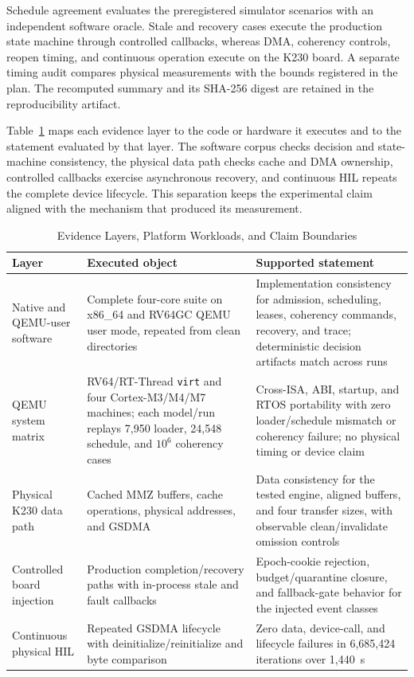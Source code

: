 \documentclass[lettersize,journal]{IEEEtran}
\begin{document}
Schedule agreement evaluates the preregistered simulator scenarios with an
independent software oracle. Stale and recovery cases execute the production
state machine through controlled callbacks, whereas DMA, coherency controls,
reopen timing, and continuous operation execute on the K230 board. A separate
timing audit compares physical measurements with the bounds registered in the
plan. The recomputed summary and its SHA-256 digest are retained in the
reproducibility artifact.

Table~\ref{tab:layers} maps each evidence layer to the code or hardware it
executes and to the statement evaluated by that layer. The software corpus
checks decision and state-machine consistency, the physical data path checks
cache and DMA ownership, controlled callbacks exercise asynchronous recovery,
and continuous HIL repeats the complete device lifecycle. This separation
keeps the experimental claim aligned with the mechanism that produced its
measurement.

\begin{table}[t]
\caption{Evidence Layers, Platform Workloads, and Claim Boundaries}
\label{tab:layers}
\centering
\footnotesize
\begin{tabular}{@{}p{}p{}p{}@{}}
\toprule
Layer & Executed object & Supported statement \\
\midrule
Native and QEMU-user software & Complete four-core suite on x86\_64 and RV64GC QEMU user mode, repeated from clean directories & Implementation consistency for admission, scheduling, leases, coherency commands, recovery, and trace; deterministic decision artifacts match across runs \\
QEMU system matrix & RV64/RT-Thread \texttt{virt} and four Cortex-M3/M4/M7 machines; each model/run replays 7,950 loader, 24,548 schedule, and $10^6$ coherency cases & Cross-ISA, ABI, startup, and RTOS portability with zero loader/schedule mismatch or coherency failure; no physical timing or device claim \\
Physical K230 data path & Cached MMZ buffers, cache operations, physical addresses, and GSDMA & Data consistency for the tested engine, aligned buffers, and four transfer sizes, with observable clean/invalidate omission controls \\
Controlled board injection & Production completion/recovery paths with in-process stale and fault callbacks & Epoch-cookie rejection, budget/quarantine closure, and fallback-gate behavior for the injected event classes \\
Continuous physical HIL & Repeated GSDMA lifecycle with deinitialize/reinitialize and byte comparison & Zero data, device-call, and lifecycle failures in 6,685,424 iterations over 1,440~s \\
\bottomrule
\end{tabular}
\end{table}
\end{document}
